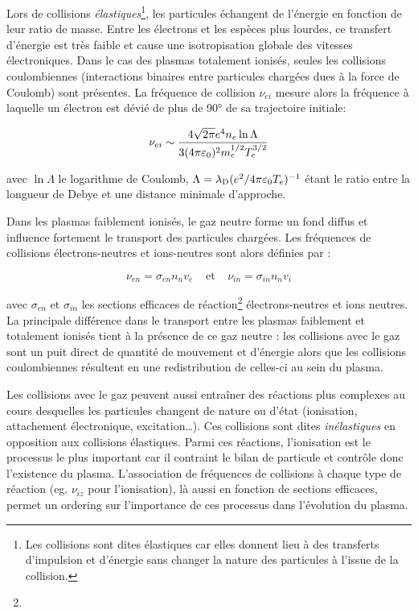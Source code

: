 \begin{refsection}
Lors de collisions \emph{élastiques}\footnote{Les collisions sont dites élastiques car
elles donnent lieu à des transferts d'impulsion et d'énergie sans changer
la nature des particules à l'issue de la collision.}, les particules échangent de l'énergie 
en fonction de leur ratio de masse. Entre les électrons et les espèces plus
lourdes, ce transfert d'énergie est très faible et cause une isotropisation
globale des vitesses électroniques.
Dans le cas des plasmas totalement ionisés, seules les collisions coulombiennes 
(interactions binaires entre particules chargées dues à la force de Coulomb)
sont présentes. 
La fréquence de collision $\nu_{ei}$ mesure alors la fréquence à laquelle un
électron est dévié de plus de 90° de sa trajectoire initiale:

\begin{equation}
	\nu_{ei}\sim\frac{4\sqrt{2\pi}e^{{4}} n_{e} \ln\Lambda
	}{3(4\pi\varepsilon{_{0}})^{{2}}m_{e}^{{1/2}}T_{e}^{{3/2}}}
\end{equation}

avec $\ln \Lambda$ le logarithme de Coulomb,
$\Lambda=\lambda_\text{D}(e^{{2}}/4\pi\varepsilon{_{0}}
T_{e})^{{-1}}$ étant le ratio entre la longueur de Debye et une
distance minimale d'approche.

Dans les plasmas faiblement ionisés, le
gaz neutre forme un fond diffus et influence fortement le transport des particules chargées.
Les fréquences de collisions électrons-neutres et ions-neutres sont alors
définies par :

\begin{equation}
	\nu_{en}=\sigma_{en} n_{n} v_{e}
	\;\;\;\;\text{et}\;\;\;\;\nu_{in}=\sigma_{in} n_{n} v_{i}
\end{equation} 
 
avec $\sigma_{en}$ et $\sigma_{in}$ les sections efficaces de
réaction\footnote{} électrons-neutres et ions neutres. La principale
différence dans le transport entre les plasmas faiblement et totalement ionisés tient à la
présence de ce gaz neutre : les collisions avec le gaz sont un puit
direct de quantité de mouvement et d'énergie alors que les
collisions coulombiennes résultent en une redistribution de celles-ci au sein
du plasma.

Les collisions avec le gaz peuvent aussi entraîner des réactions plus complexes
au cours desquelles les particules changent de nature ou d'état (ionisation,
attachement électronique, excitation\ldots).
Ces collisions sont dites \emph{inélastiques} en opposition aux collisions
élastiques. Parmi ces réactions, l'ionisation est le processus le plus
important car il contraint le bilan de particule et contrôle donc l'existence
du plasma. L'association de fréquences de collisions à chaque type de réaction
(eg. $\nu_{iz}$ pour l'ionisation), là aussi en fonction de sections
efficaces, permet un ordering sur l'importance de ces processus dans l'évolution
du plasma.


\end{refsection}
